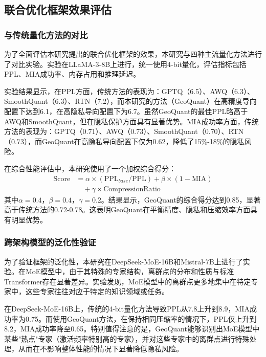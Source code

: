 \subsection{联合优化框架效果评估}

\subsubsection{与传统量化方法的对比}

为了全面评估本研究提出的联合优化框架的效果，本研究与四种主流量化方法进行了对比实验。实验在LLaMA-3-8B上进行，统一使用4-bit量化，评估指标包括PPL、MIA成功率、内存占用和推理延迟。

实验结果显示，在PPL方面，传统方法的表现为：GPTQ（6.5）、AWQ（6.3）、SmoothQuant（6.3）、RTN（7.2），而本研究的方法（GeoQuant）在高精度导向配置下达到6.1，在高隐私导向配置下为6.7。虽然GeoQuant的最佳PPL略高于AWQ和SmoothQuant，但在隐私保护方面具有显著优势。MIA成功率方面，传统方法的表现为：GPTQ（0.71）、AWQ（0.73）、SmoothQuant（0.70）、RTN（0.73），而GeoQuant在高隐私导向配置下仅为0.62，降低了15\%-18\%的隐私风险。

在综合性能评估中，本研究使用了一个加权综合得分：
\begin{align}
\text{Score} &= \alpha \times (\text{PPL}_{base}/\text{PPL}) + \beta \times (1 - \text{MIA}) \nonumber \\
&\quad + \gamma \times \text{CompressionRatio}
\end{align}
其中$\alpha=0.4$，$\beta=0.4$，$\gamma=0.2$。结果显示，GeoQuant的综合得分达到0.85，显著高于传统方法的0.72-0.78。这表明GeoQuant在平衡精度、隐私和压缩效率方面具有明显优势。

\subsubsection{跨架构模型的泛化性验证}

为了验证框架的泛化性，本研究在DeepSeek-MoE-16B和Mistral-7B上进行了实验。在MoE模型中，由于其特殊的专家结构，离群点的分布和性质与标准Transformer存在显著差异。实验发现，MoE模型中的离群点更多地集中在特定专家中，这些专家往往对应于特定的知识领域或任务。

在DeepSeek-MoE-16B上，传统的4-bit量化方法导致PPL从7.8上升到8.9，MIA成功率为0.75。而使用GeoQuant方法，在保持相同压缩率的情况下，PPL仅上升到8.2，MIA成功率降至0.65。特别值得注意的是，GeoQuant能够识别出MoE模型中某些"热点"专家（激活频率特别高的专家），并对这些专家中的离群点进行特殊处理，从而在不影响整体性能的情况下显著降低隐私风险。

